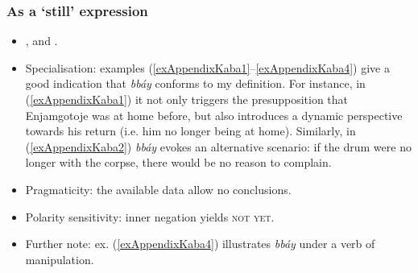 \subsubsection{As a  \lq still\rq{ }expression}
\begin{itemize}
	\item \textcite[41]{Keegan2014}, \textcite[423–425]{Moser2004} and \textcite[10]{MoserDingatoloum2007}.
	\item Specialisation: examples (\ref{exAppendixKaba1}–\ref{exAppendixKaba4}) give a good indication that \textit{bbáy} conforms to my definition. For instance, in (\ref{exAppendixKaba1}) it not only triggers the presupposition that Enjamgotoje was at home before, but also introduces a dynamic perspective towards his return (i.e. him no longer being at home). Similarly, in (\ref{exAppendixKaba2}) \textit{bbáy} evokes an alternative scenario: if the drum were no longer with the corpse, there would be no reason to complain.	
	\item Pragmaticity: the available data allow no conclusions.
	\item Polarity sensitivity: inner negation yields \textsc{not yet}.
	\item Further note: ex. (\ref{exAppendixKaba4}) illustrates \textit{bbáy} under a verb of manipulation.
\end{itemize}
